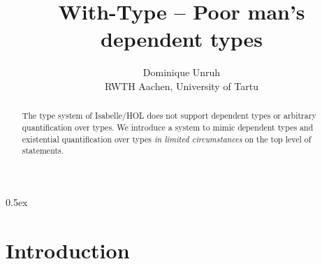 \documentclass[11pt,a4paper]{article}
\begin{document}
\title{With-Type -- Poor man's dependent types}
\author{Dominique Unruh\\
 \footnotesize RWTH Aachen, University of Tartu}
\maketitle

\begin{abstract}
  The type system of Isabelle/HOL does not support dependent types or arbitrary quantification over types.
  We introduce a system to mimic dependent types and existential quantification over types \emph{in limited circumstances} on the top level of statements.
\end{abstract}

\tableofcontents

\parindent 0pt\parskip 0.5ex

\section{Introduction}
\end{document}
